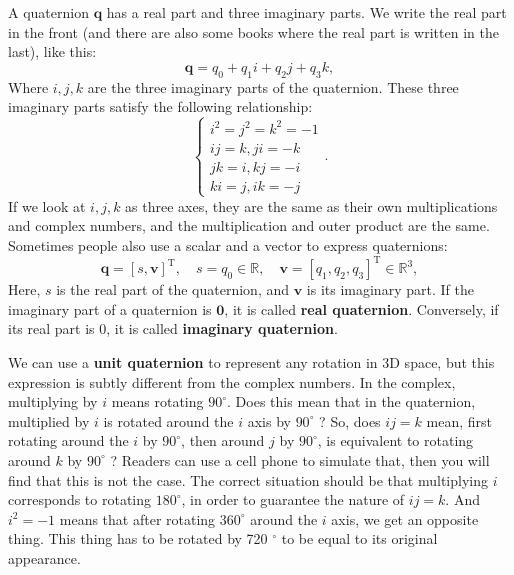 A quaternion $ \mathbf{q} $ has a real part and three imaginary parts. We write the real part in the front (and there are also some books where the real part is written in the last), like this:
\begin{equation}
\mathbf{q} = q_0 + q_1 i + q_2 j + q_3 k,
\end{equation}
Where $ i,j,k $ are the three imaginary parts of the quaternion. These three imaginary parts satisfy the following relationship:
\begin{equation}
\label{eq:quaternionVirtual}
\left\{ \begin{array}{l}
{i^2} = {j^2} = {k^2} =  - 1\\
ij = k, ji = - k \\
jk = i,kj =  - i\\
ki = j, ik = - j
\end{array} \right. .
\end{equation}
If we look at $ i, j, k $ as three axes, they are the same as their own multiplications and complex numbers, and the multiplication and outer product are the same. Sometimes people also use a scalar and a vector to express quaternions:
\[
\mathbf{q} = \left[ s, \mathbf{v} \right]^\mathrm{T}, \quad s=q_0 \in \mathbb{R},\quad \mathbf{v} = [q_1, q_2, q_3]^\mathrm{T} \in \mathbb{R}^3,
\]
Here, $ s $ is the real part of the quaternion, and $ \mathbf {v} $ is its imaginary part. If the imaginary part of a quaternion is $ \mathbf {0} $, it is called \textbf{real quaternion}. Conversely, if its real part is $ 0 $, it is called \textbf{imaginary quaternion}.

We can use a \textbf{unit quaternion} to represent any rotation in 3D space, but this expression is subtly different from the complex numbers. In the complex, multiplying by $ i $ means rotating $ 90 ^ \circ $. Does this mean that in the quaternion, multiplied by $ i $ is rotated around the $ i $ axis by $ 90 ^ \circ $ ? So, does $ ij = k $ mean, first rotating around the $ i $ by $ 90 ^ \circ $, then around $j$ by $ 90 ^ \circ $, is equivalent to rotating around $ k$ by $ 90 ^ \circ $ ? Readers can use a cell phone to simulate that, then you will find that this is not the case. The correct situation should be that multiplying $ i $ corresponds to rotating $ 180 ^ \circ $, in order to guarantee the nature of $ ij=k $. And $ i^ 2 =- 1 $ means that after rotating $ 360 ^ \circ $ around the $ i $ axis, we get an opposite thing. This thing has to be rotated by 720 $^\circ$ to be equal to its original appearance.

